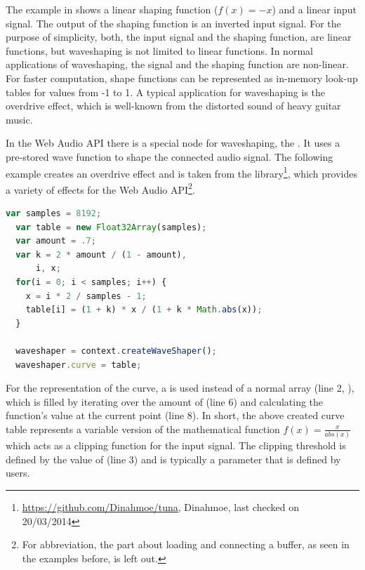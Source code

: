 The example in  shows a linear shaping function ($ f(x) = -x $) and a linear input signal. The output of the shaping function is an inverted input signal. For the purpose of simplicity, both, the input signal and the shaping function, are linear functions, but waveshaping is not limited to linear functions. In normal applications of waveshaping, the signal and the shaping function are non-linear. For faster computation, shape functions can be represented as in-memory look-up tables for values from -1 to 1. A typical application for waveshaping is the overdrive effect, which is well-known from the distorted sound of heavy guitar music.

In the Web Audio API there is a special node for waveshaping, the . It uses a pre-stored wave function to shape the connected audio signal. The following example creates an overdrive effect and is taken from the  library\footnote{\url{https://github.com/Dinahmoe/tuna}, Dinahmoe, last checked on 20/03/2014}, which provides a variety of effects for the Web Audio API\footnote{For abbreviation, the part about loading and connecting a buffer, as seen in the examples before, is left out.}.

\begin{lstlisting}[language=JavaScript, caption=Using the WaveShaperNode, label=lst:waveshaper-node]
  var samples = 8192;
  var table = new Float32Array(samples);
  var amount = .7;
  var k = 2 * amount / (1 - amount),
      i, x;
  for(i = 0; i < samples; i++) {
    x = i * 2 / samples - 1;
    table[i] = (1 + k) * x / (1 + k * Math.abs(x));
  }

  waveshaper = context.createWaveShaper();
  waveshaper.curve = table;
\end{lstlisting}

For the representation of the curve, a  is used instead of a normal array (line 2, ), which is filled by iterating over the amount of  (line 6) and calculating the function's value at the current point (line 8). In short, the above created curve table represents a variable version of the mathematical function $ f(x) = \frac{x}{abs(x)} $ which acts as a clipping function for the input signal. The clipping threshold is defined by the value of  (line 3) and is typically a parameter that is defined by users.